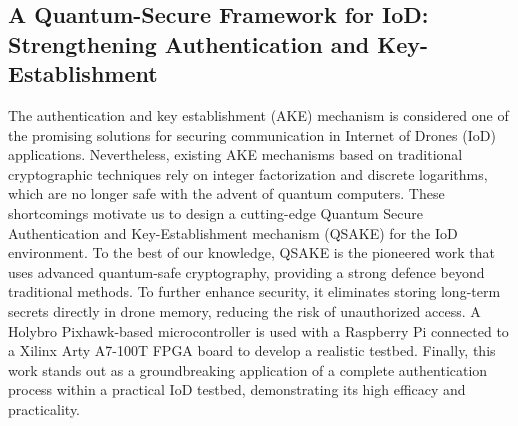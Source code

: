 \documentclass[11pt]{article}
\theoremstyle{definition}
\theoremstyle{remark}
\theoremstyle{plain}
\begin{document}
\subsection{\cite{10.1145/3708821.3736219} A Quantum-Secure Framework for IoD: Strengthening Authentication and Key-Establishment}
The authentication and key establishment (AKE) mechanism is considered one of the promising solutions for securing communication in Internet of Drones (IoD) applications. Nevertheless, existing AKE mechanisms based on traditional cryptographic techniques rely on integer factorization and discrete logarithms, which are no longer safe with the advent of quantum computers. These shortcomings motivate us to design a cutting-edge Quantum Secure Authentication and Key-Establishment mechanism (QSAKE) for the IoD environment. To the best of our knowledge, QSAKE is the pioneered work that uses advanced quantum-safe cryptography, providing a strong defence beyond traditional methods. To further enhance security, it eliminates storing long-term secrets directly in drone memory, reducing the risk of unauthorized access. A Holybro Pixhawk-based microcontroller is used with a Raspberry Pi connected to a Xilinx Arty A7-100T FPGA board to develop a realistic testbed. Finally, this work stands out as a groundbreaking application of a complete authentication process within a practical IoD testbed, demonstrating its high efficacy and practicality.

%
%
\printbibliography
\end{document}
